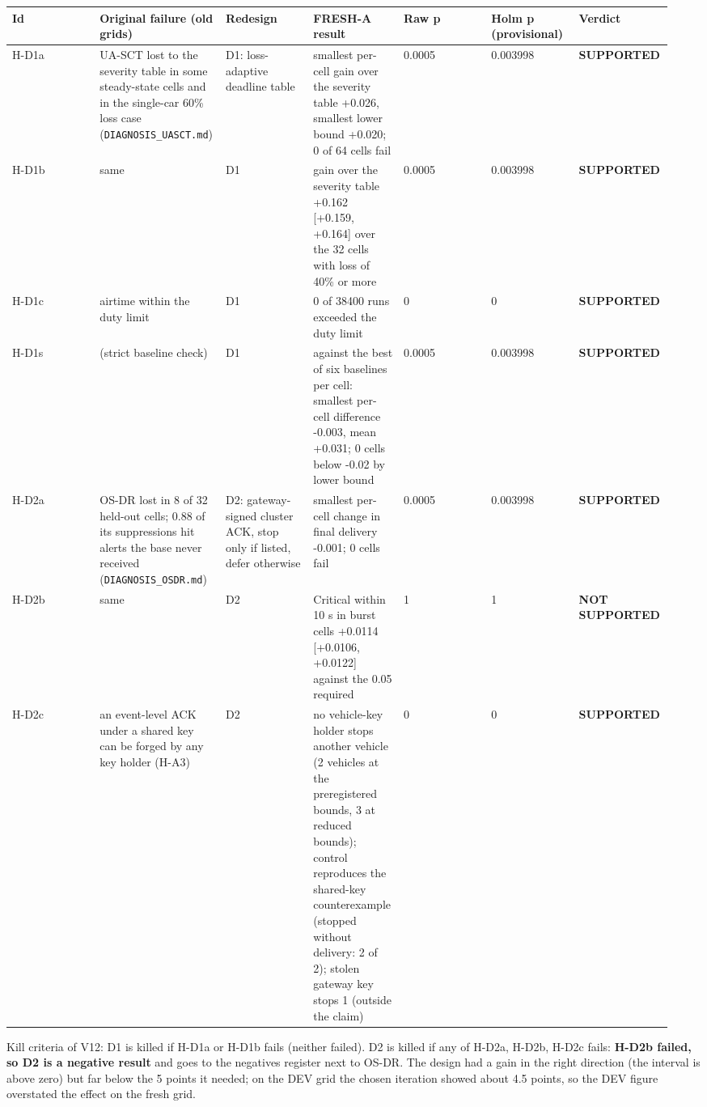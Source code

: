 {\scriptsize\raggedright
\begin{longtable}{p{0.136\linewidth}p{0.136\linewidth}p{0.136\linewidth}p{0.136\linewidth}p{0.136\linewidth}p{0.136\linewidth}p{0.136\linewidth}}
\toprule
Id & Original failure (old grids) & Redesign & FRESH-A result & Raw p & Holm p (provisional) & Verdict \\
\midrule
\endhead
H-D1a & UA-SCT lost to the severity table in some steady-state cells and in the single-car 60\% loss case (\texttt{DIAGNOSIS\_UASCT.md}) & D1: loss-adaptive deadline table & smallest per-cell gain over the severity table +0.026, smallest lower bound +0.020; 0 of 64 cells fail & 0.0005 & 0.003998 & \textbf{SUPPORTED} \\
H-D1b & same & D1 & gain over the severity table +0.162 [+0.159, +0.164] over the 32 cells with loss of 40\% or more & 0.0005 & 0.003998 & \textbf{SUPPORTED} \\
H-D1c & airtime within the duty limit & D1 & 0 of 38400 runs exceeded the duty limit & 0 & 0 & \textbf{SUPPORTED} \\
H-D1s & (strict baseline check) & D1 & against the best of six baselines per cell: smallest per-cell difference -0.003, mean +0.031; 0 cells below -0.02 by lower bound & 0.0005 & 0.003998 & \textbf{SUPPORTED} \\
H-D2a & OS-DR lost in 8 of 32 held-out cells; 0.88 of its suppressions hit alerts the base never received (\texttt{DIAGNOSIS\_OSDR.md}) & D2: gateway-signed cluster ACK, stop only if listed, defer otherwise & smallest per-cell change in final delivery -0.001; 0 cells fail & 0.0005 & 0.003998 & \textbf{SUPPORTED} \\
H-D2b & same & D2 & Critical within 10 s in burst cells +0.0114 [+0.0106, +0.0122] against the 0.05 required & 1 & 1 & \textbf{NOT SUPPORTED} \\
H-D2c & an event-level ACK under a shared key can be forged by any key holder (H-A3) & D2 & no vehicle-key holder stops another vehicle (2 vehicles at the preregistered bounds, 3 at reduced bounds); control reproduces the shared-key counterexample (stopped without delivery: 2 of 2); stolen gateway key stops 1 (outside the claim) & 0 & 0 & \textbf{SUPPORTED} \\
\bottomrule
\end{longtable}}

Kill criteria of V12: D1 is killed if H-D1a or H-D1b fails (neither failed). D2 is killed if any of H-D2a, H-D2b, H-D2c fails: \textbf{H-D2b failed, so D2 is a negative result} and goes to the negatives register next to OS-DR. The design had a gain in the right direction (the interval is above zero) but far below the 5 points it needed; on the DEV grid the chosen iteration showed about 4.5 points, so the DEV figure overstated the effect on the fresh grid.

